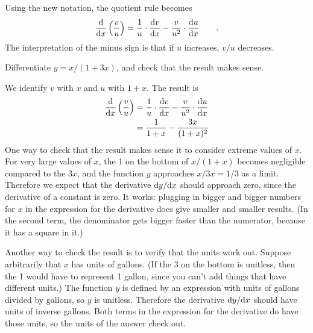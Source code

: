Using the new notation, the quotient rule becomes
\begin{equation*}
  \frac{\textup{d}}{\textup{d} x} \left(\frac{v}{u}\right) = \frac{1}{u}\cdot\frac{\textup{d} v}{\textup{d} x} - \frac{v}{u^2} \cdot \frac{\textup{d} u}{\textup{d} x} \qquad .
\end{equation*}
The interpretation of the minus sign is that if $u$ increases, $v/u$ decreases.

\begin{eg}
\egquestion Differentiate $y=x/(1+3x)$, and check that the result makes sense.

\eganswer We identify $v$ with $x$ and $u$ with $1+x$. The result is
\begin{align*}
  \frac{\textup{d}}{\textup{d} x} \left(\frac{v}{u}\right) &= \frac{1}{u}\cdot\frac{\textup{d} v}{\textup{d} x} - \frac{v}{u^2} \cdot \frac{\textup{d} u}{\textup{d} x} \\
            &= \frac{1}{1+x} - \frac{3x}{(1+x)^2} 
\end{align*}
One way to check that the result makes sense it to consider extreme values of $x$. For very large values of $x$, the
1 on the bottom of $x/(1+x)$ becomes negligible compared to the $3x$, and the function $y$ approaches $x/3x=1/3$ as a limit.
Therefore we expect that the derivative $\textup{d} y/\textup{d} x$ should approach zero, since the derivative of a constant is
zero. It works: plugging in bigger and bigger numbers for $x$ in the expression for the derivative does give
smaller and smaller results. (In the second term, the denominator gets bigger faster than the numerator, because
it has a square in it.)

Another way to check the result is to verify that the units work out. Suppose arbitrarily that $x$ has units of gallons.
(If the 3 on the bottom is unitless, then the 1 would have to represent 1 gallon, since you can't add things that have
different units.) The function $y$ is defined by an expression with units of gallons divided by gallons, so $y$ is
unitless. Therefore the derivative $\textup{d} y/\textup{d} x$ should have units of inverse gallons. Both terms in the
expression for the derivative do have those units, so the units of the answer check out.
\end{eg}

